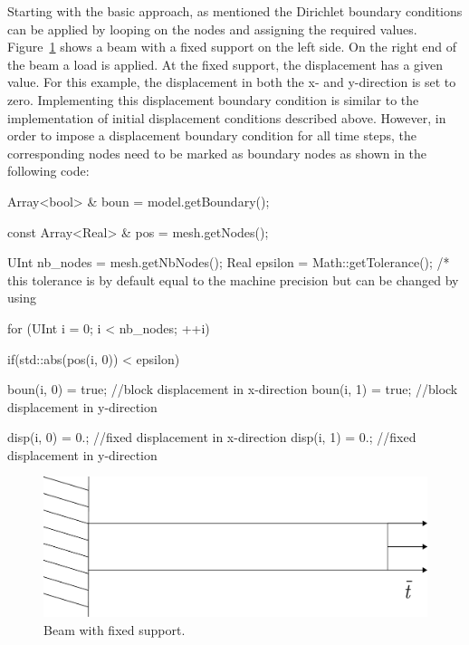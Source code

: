 Starting with the basic approach, as mentioned the Dirichlet boundary conditions can be applied by looping on the nodes and assigning the required values. Figure~\ref{fig:smm:dirichlet_bc} shows a beam with  a fixed support on the left
side. On the right end of the beam  a load is applied. At the fixed support, the
displacement has a  given value. For this example, the  displacement in both the
x-  and y-direction  is set  to  zero. Implementing  this displacement  boundary
condition is  similar to the  implementation of initial  displacement conditions
described above. However,  in order to impose a  displacement boundary condition
for all time steps, the corresponding  nodes need to be marked as boundary nodes
as shown in the following code:

 \begin{cpp}
   Array<bool> & boun = model.getBoundary();

  const Array<Real> & pos = mesh.getNodes();

  UInt nb_nodes = mesh.getNbNodes();
  Real epsilon = Math::getTolerance();
  /* this  tolerance is  by default equal  to the  machine precision but  can be changed by using %

  for (UInt i = 0; i < nb_nodes; ++i) {
    if(std::abs(pos(i, 0)) < epsilon) {
      boun(i, 0) = true;  //block displacement in x-direction
      boun(i, 1) = true;  //block displacement in y-direction

      disp(i, 0) = 0.;   //fixed displacement in x-direction
      disp(i, 1) = 0.;   //fixed displacement in y-direction
    }
  }
\end{cpp}
\begin{figure}[!htb]
  \centering
  \includegraphics[scale=0.4]{figures/dirichlet}
  \caption{Beam with fixed support.\label{fig:smm:dirichlet_bc}}
\end{figure}

